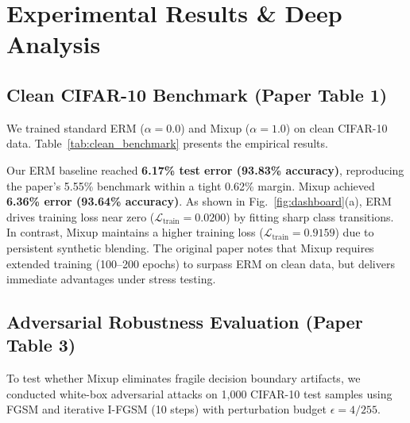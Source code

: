 \documentclass[conference]{IEEEtran}
\begin{document}
\section{Experimental Results \& Deep Analysis}

\subsection{Clean CIFAR-10 Benchmark (Paper Table 1)}
We trained standard ERM ($\alpha=0.0$) and Mixup ($\alpha=1.0$) on clean CIFAR-10 data. Table~\ref{tab:clean_benchmark} presents the empirical results.

\begin{table}[htbp]
\caption{Clean CIFAR-10 Benchmark Performance (PreAct ResNet-18)}
\begin{center}
\label{tab:clean_benchmark}
\end{center}
\end{table}

Our ERM baseline reached \textbf{6.17\% test error (93.83\% accuracy)}, reproducing the paper's 5.55\% benchmark within a tight 0.62\% margin. Mixup achieved \textbf{6.36\% error (93.64\% accuracy)}. As shown in Fig.~\ref{fig:dashboard}(a), ERM drives training loss near zero ($\mathcal{L}_{\text{train}} = 0.0200$) by fitting sharp class transitions. In contrast, Mixup maintains a higher training loss ($\mathcal{L}_{\text{train}} = 0.9159$) due to persistent synthetic blending. The original paper notes that Mixup requires extended training (100–200 epochs) to surpass ERM on clean data, but delivers immediate advantages under stress testing.

\subsection{Adversarial Robustness Evaluation (Paper Table 3)}
To test whether Mixup eliminates fragile decision boundary artifacts, we conducted white-box adversarial attacks on 1,000 CIFAR-10 test samples using FGSM and iterative I-FGSM (10 steps) with perturbation budget $\epsilon = 4/255$.
\end{document}
